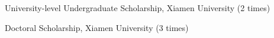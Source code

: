 

\begin{cvskills}
  \cvskill
    {}
    {University-level Undergraduate Scholarship, Xiamen University (2 times)}

  \cvskill
    {}
    {Doctoral Scholarship, Xiamen University (3 times)}
\end{cvskills}
